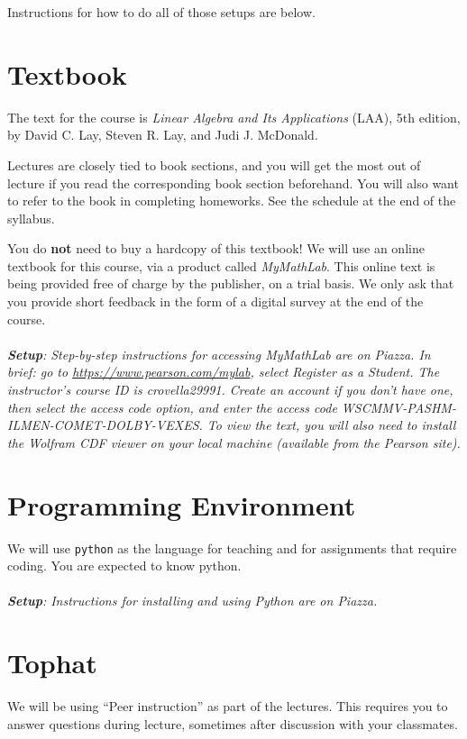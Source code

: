 \documentclass[11pt]{article}
\begin{document}
Instructions for how to do all of those setups are below.

\section*{Textbook} 

The text for the course is \emph{Linear Algebra and
  Its Applications} (LAA), 5th edition, by David C. Lay, Steven R. Lay,
and Judi J. McDonald.    

Lectures are closely tied to book sections, and you will get
the most out of lecture if you read the corresponding book section
beforehand.   You will also want to refer to the book in completing
homeworks.   See the schedule at the end of the syllabus.

You do \textbf{not} need to buy a hardcopy of this textbook!
We will use an online textbook for this course, via a product called
\emph{MyMathLab}.   This online text is 
being provided free of charge by the publisher, on a trial basis.   We
only ask that you provide short feedback in the form of a digital
survey at the end of the course.
\\
~\\\emph{\textbf{Setup}: Step-by-step instructions for accessing MyMathLab are on
  Piazza.  In brief: go to \url{https://www.pearson.com/mylab}, select
  Register as a Student.   The instructor's course ID is crovella29991.
Create an account if you don't have one, then select the access code
option, and enter the access code WSCMMV-PASHM-ILMEN-COMET-DOLBY-VEXES.
To view the text, you will also need to install the Wolfram CDF viewer on
your local machine (available from the Pearson site).}

\section*{Programming Environment}

We will use \texttt{python} as the language for teaching and for
assignments that require coding.    You are expected to know python.  
\\
~\\\noindent\emph{\textbf{Setup}: Instructions for installing and
using Python are on Piazza.}

\section*{Tophat}

We will be using ``Peer instruction'' as part of the lectures.  This
requires you to answer questions during lecture, sometimes
after discussion with your classmates.   
\end{document}
